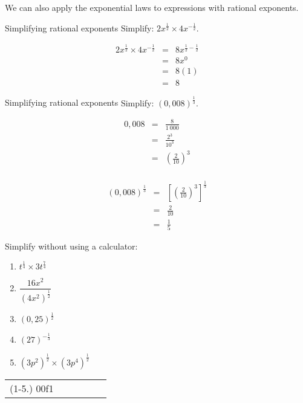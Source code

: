 We can also apply the exponential laws to expressions with rational exponents.\\

\begin{wex}
{Simplifying rational exponents}
{Simplify: $2x^{\frac{1}{2}}\times 4x^{-\frac{1}{2}}$.}
{

\begin{eqnarray*}
 2x^{\frac{1}{2}} \times 4x^{-\frac{1}{2}} & = & 8x^{\frac{1}{2}-\frac{1}{2}} \\
					  & = & 8x^0 \\
					  & = & 8(1) \\
					  & = & 8 
\end{eqnarray*}
}
\end{wex}


\begin{wex}
{Simplifying rational exponents} 
{Simplify: $(0,008)^{\frac{1}{3}}$.}
{

\begin{eqnarray*}
 0,008 & = & \frac{8}{1~000} \\
       & = & \frac{2^3}{10^3} \\
       & = & \left(\frac{2}{10}\right)^3\\
\end{eqnarray*}

\begin{eqnarray*}
 (0,008)^{\frac{1}{3}} & = & \left[\left(\frac{2}{10}\right)^3\right]^{\frac{1}{3}} \\
		 & = & \frac{2}{10} \\
		 & = & \frac{1}{5}
\end{eqnarray*}
}
\end{wex}

\begin{exercises}{}{Simplify without using a calculator:
\begin{multicols}{2}
\begin{enumerate}[label=\textbf{\arabic*}., itemsep=5pt]
 \item $ t^{\frac{1}{4}} \times 3t^{\frac{7}{4}} $
 \item $ \dfrac{16x^2}{(4x^2)^{\frac{1}{2}}} $
 \item $ (0,25)^{\frac{1}{2}} $
 \item $ (27)^{-\frac{1}{3}} $
 \item $ (3p^2)^{\frac{1}{2}} \times (3p^4)^{\frac{1}{2}} $
\end{enumerate}
\end{multicols}
\practiceinfo
\par 
\begin{tabular}[h]{cccccc}
(1-5.) 00f1\end{tabular}
}
\end{exercises}


